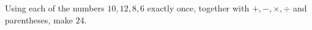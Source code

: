 Using each of the numbers $10,12,8,6$ exactly once, together with $+,-,\times,\div$ and parentheses, make $24$.
